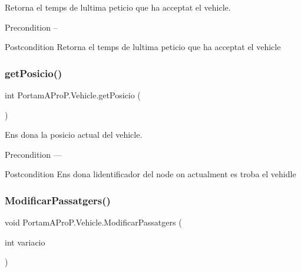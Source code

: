 Retorna el temps de l\textquotesingle{}ultima peticio que ha acceptat el vehicle. 

\begin{DoxyPrecond}{Precondition}
-- 
\end{DoxyPrecond}
\begin{DoxyPostcond}{Postcondition}
Retorna el temps de l\textquotesingle{}ultima peticio que ha acceptat el vehicle 
\end{DoxyPostcond}
\mbox{\label{class_portam_a_pro_p_1_1_vehicle_a56c8e150a14137bb6e0722d4d697c0c5}} 
\subsubsection{\texorpdfstring{get\+Posicio()}{getPosicio()}}
{\footnotesize\ttfamily int Portam\+A\+Pro\+P.\+Vehicle.\+get\+Posicio (\begin{DoxyParamCaption}{ }\end{DoxyParamCaption})}



Ens dona la posicio actual del vehicle. 

\begin{DoxyPrecond}{Precondition}
--- 
\end{DoxyPrecond}
\begin{DoxyPostcond}{Postcondition}
Ens dona l\textquotesingle{}identificador del node on actualment es troba el vehidle 
\end{DoxyPostcond}
\mbox{\label{class_portam_a_pro_p_1_1_vehicle_a0b870654a23dba4acdb2b8a9614a93d8}} 
\subsubsection{\texorpdfstring{Modificar\+Passatgers()}{ModificarPassatgers()}}
{\footnotesize\ttfamily void Portam\+A\+Pro\+P.\+Vehicle.\+Modificar\+Passatgers (\begin{DoxyParamCaption}\item[{int}]{variacio }\end{DoxyParamCaption})}



